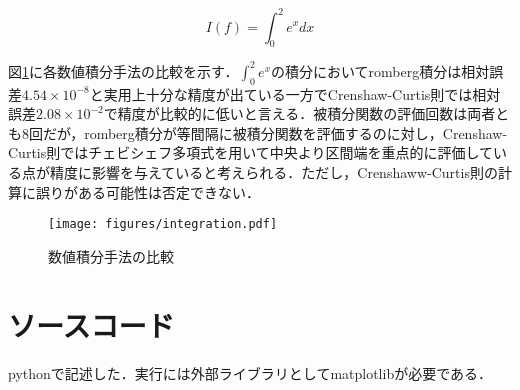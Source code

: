 \documentclass{jsarticle}
\begin{document}
$$I(f)=\int_0^2 e^x dx$$

図\ref{integration-fig}に各数値積分手法の比較を示す．$\int_0^2 e^x$の積分においてromberg積分は相対誤差$4.54\times10^{-8}$と実用上十分な精度が出ている一方でCrenshaw-Curtis則では相対誤差$2.08\times 10^{-2}$で精度が比較的に低いと言える．被積分関数の評価回数は両者とも8回だが，romberg積分が等間隔に被積分関数を評価するのに対し，Crenshaw-Curtis則ではチェビシェフ多項式を用いて中央より区間端を重点的に評価している点が精度に影響を与えていると考えられる．ただし，Crenshaww-Curtis則の計算に誤りがある可能性は否定できない．

\begin{figure}[htbp]
    \texttt{[image: figures/integration.pdf]}
  \centering
  \caption{数値積分手法の比較\label{integration-fig}}
\end{figure}

\section{ソースコード}

pythonで記述した．実行には外部ライブラリとしてmatplotlibが必要である．
\end{document}

